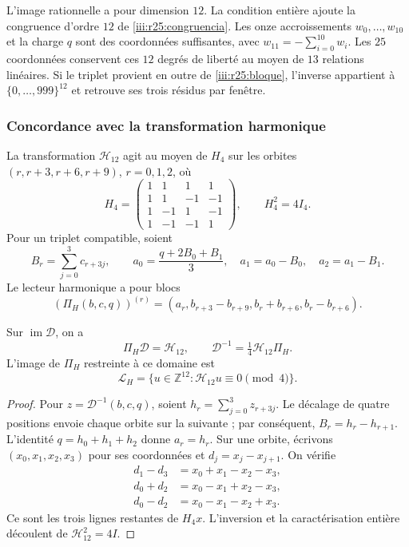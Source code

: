 L’image rationnelle a pour dimension $12$. La condition entière ajoute
la congruence d’ordre $12$ de \eqref{iii:r25:congruencia}.
Les onze accroissements $w_0,\ldots,w_{10}$ et la charge $q$ sont
des coordonnées suffisantes, avec $w_{11}=-\sum_{i=0}^{10}w_i$.
Les $25$ coordonnées conservent ces $12$ degrés de liberté
au moyen de $13$ relations linéaires. Si le triplet provient en outre de
\eqref{iii:r25:bloque}, l’inverse appartient à
$\{0,\ldots,999\}^{12}$ et retrouve ses trois résidus par fenêtre.

\subsubsection{Concordance avec la transformation harmonique}

La transformation $\mathcal H_{12}$ agit au moyen de $H_4$ sur les
orbites $(r,r+3,r+6,r+9)$, $r=0,1,2$, où
\[
 H_4=\begin{pmatrix}
 1&1&1&1\\1&1&-1&-1\\1&-1&1&-1\\1&-1&-1&1
 \end{pmatrix},\qquad H_4^2=4I_4.
\]
Pour un triplet compatible, soient
\[
 B_r=\sum_{j=0}^3c_{r+3j},\qquad
 a_0=\frac{q+2B_0+B_1}{3},\quad
 a_1=a_0-B_0,\quad a_2=a_1-B_1.
\]
Le lecteur harmonique a pour blocs
\[
 (\Pi_H(b,c,q))^{(r)}
 =(a_r,b_{r+3}-b_{r+9},b_r+b_{r+6},b_r-b_{r+6}).
\]

\begin{proposition}
\label{iii:r25:hadamard}
Sur $\operatorname{im}\mathcal D$, on a
\[
 \Pi_H\mathcal D=\mathcal H_{12},\qquad
 \mathcal D^{-1}=\tfrac14\mathcal H_{12}\Pi_H.
\]
L’image de $\Pi_H$ restreinte à ce domaine est
\[
 \mathcal L_H=
 \{u\in\mathbb Z^{12}:\mathcal H_{12}u\equiv0\pmod4\}.
\]
\end{proposition}
\begin{proof}
Pour $z=\mathcal D^{-1}(b,c,q)$, soient
$h_r=\sum_{j=0}^3z_{r+3j}$. Le décalage de quatre positions
envoie chaque orbite sur la suivante ; par conséquent, $B_r=h_r-h_{r+1}$.
L’identité $q=h_0+h_1+h_2$ donne $a_r=h_r$.
Sur une orbite, écrivons $(x_0,x_1,x_2,x_3)$ pour ses coordonnées
et $d_j=x_j-x_{j+1}$. On vérifie
\[
 \begin{aligned}
 d_1-d_3&=x_0+x_1-x_2-x_3,\\
 d_0+d_2&=x_0-x_1+x_2-x_3,\\
 d_0-d_2&=x_0-x_1-x_2+x_3.
 \end{aligned}
\]
Ce sont les trois lignes restantes de $H_4x$. L’inversion et la
caractérisation entière découlent de $\mathcal H_{12}^2=4I$.
\end{proof}

